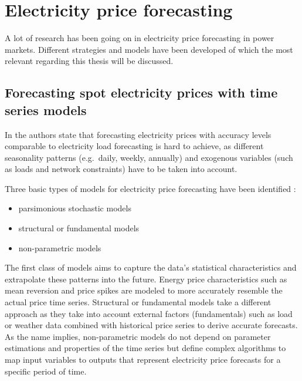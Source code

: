 

\section{Electricity price forecasting} \label{sec:electricity_price_forecasting}

A lot of research has been going on in electricity price forecasting in power markets. Different strategies and models have been developed of which the most relevant regarding this thesis will be discussed. 


\subsection{Forecasting spot electricity prices with time series models}

In \cite{weron2005forecasting} the authors state that forecasting electricity prices with accuracy levels comparable to electricity load forecasting is hard to achieve, as different seasonality patterns (e.g.~daily, weekly, annually) and exogenous variables (such as loads and network constraints) have to be taken into account. 


Three basic types of models for electricity price forecasting have been identified \cite{bunn2003forecasting,weron2005forecasting}: 

\begin{itemize}
	\item parsimonious stochastic models
	\item structural or fundamental models
	\item non-parametric models
\end{itemize}

The first class of models aims to capture the data's statistical characteristics and extrapolate these patterns into the future. Energy price characteristics such as mean reversion and price spikes are modeled to more accurately resemble the actual price time series. Structural or fundamental models take a different approach as they take into account external factors (fundamentals) such as load or weather data combined with historical price series to derive accurate forecasts. As the name implies, non-parametric models do not depend on parameter estimations and properties of the time series but define complex algorithms to map input variables to outputs that represent electricity price forecasts for a specific period of time. 

